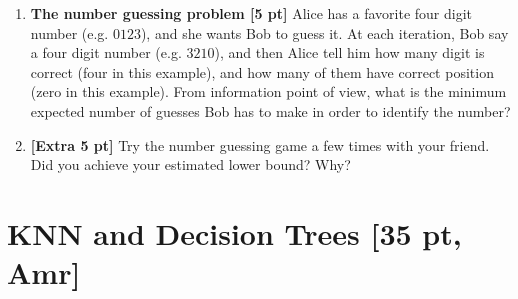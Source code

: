 \documentclass[11pt]{article}
\begin{document}
\begin{enumerate}
\item
\textbf{The number guessing problem [5 pt]} Alice has a favorite four digit number
 (e.g. $0123$), and she wants Bob to guess it. At each
iteration, Bob say a four digit number (e.g. $3210$), and then Alice tell him
how many digit is correct (four in this example), and how many of them have
correct position (zero in this example). From information point of view, what is the minimum expected number of guesses
Bob has to make in order to identify the number?

\item
\textbf{[Extra 5 pt]}
Try the number guessing game a few times with your friend. Did you achieve your estimated lower bound? Why?

\end{enumerate}
\section{KNN and Decision Trees [35 pt, Amr]}
\end{document}
